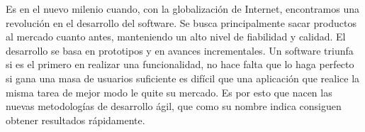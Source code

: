 Es en el nuevo milenio cuando, con la globalización de Internet,
encontramos una revolución en el desarrollo del software. Se busca
principalmente sacar productos al mercado cuanto antes, manteniendo un
alto nivel de fiabilidad y calidad. El desarrollo se basa en
prototipos y en avances incrementales. Un software triunfa si es el
primero en realizar una funcionalidad, no hace falta que lo haga
perfecto si gana una masa de usuarios suficiente es difícil que una
aplicación que realice la misma tarea de mejor modo le quite su
mercado. Es por esto que nacen las nuevas metodologías de desarrollo
ágil, que como su nombre indica consiguen obtener resultados
rápidamente.
